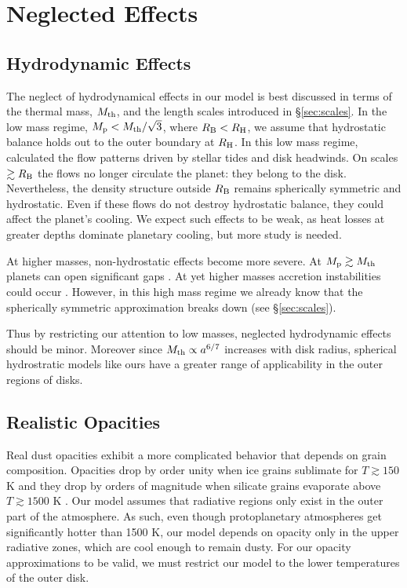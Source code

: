 \documentclass[apj, numberedappendix]{emulateapj}
\newcommand{\RB}{R_{\rm B}}
\newcommand{\RH}{R_{\rm H}}
\newcommand{\pla}{_{\rm p}}
\begin{document}
\section{Neglected Effects}\label{sec:neglected}

\subsection{Hydrodynamic Effects}\label{sec:hydro}
The neglect of hydrodynamical effects in our model is best discussed in terms of the thermal mass, $M_{\rm th}$, and the length scales introduced in \S\ref{sec:scales}.  In the low mass regime, $M\pla < M_{\rm th}/ \sqrt{3}$, where $\RB < \RH$, we assume that hydrostatic balance holds out to the outer boundary at $\RH$.   In this low mass regime, \citet[]{Orm13} calculated the flow patterns driven by stellar tides and disk headwinds.     On scales $\gtrsim \RB$ the flows no longer circulate the planet: they belong to the disk.  Nevertheless, the density structure outside $\RB$ remains spherically symmetric and hydrostatic.  Even if these flows do not destroy hydrostatic balance, they could affect the planet's cooling.  We expect such effects to be weak, as heat losses at greater depths dominate planetary cooling, but more study is needed.

At higher masses, non-hydrostatic effects become more severe.  At $M\pla \gtrsim M_{\rm th}$ planets can open significant gaps \citep{zhu13}.  At yet higher masses accretion instabilities could occur \citep{AylBat12}.  However, in this high mass regime we already know that the spherically symmetric approximation breaks down (see \S\ref{sec:scales}). %

Thus by restricting our attention to low masses, neglected hydrodynamic effects should be minor.   Moreover since $M_{\rm th} \propto a^{6/7}$ increases with disk radius, spherical hydrostratic models like ours have a greater range of applicability in the outer regions of disks. 


\subsection{Realistic Opacities}\label{sec:op}

Real dust opacities exhibit a more complicated behavior that depends on grain composition.  Opacities drop by order unity when ice grains sublimate for $T \gtrsim 150$ K and they drop by orders of magnitude when silicate grains evaporate above $T \gtrsim 1500$ K \citep{semenov03, FerAle05}. Our model assumes that radiative regions only exist in the outer part of the atmosphere. As such, even though protoplanetary atmospheres get significantly hotter than 1500 K, our model depends on opacity only in the upper radiative zones, which are cool enough to remain dusty. For our opacity approximations to be valid, we must restrict our model to the lower temperatures of the outer disk.   
\end{document}
